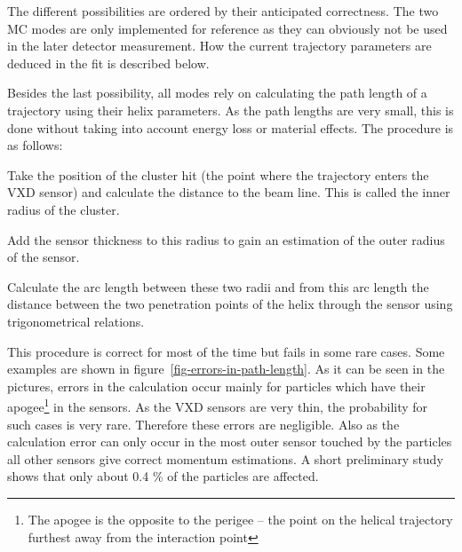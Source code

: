The different possibilities are ordered by their anticipated correctness. The two MC modes are only implemented for reference as they can obviously not be used in the later detector measurement. How the current trajectory parameters are deduced in the fit is described below.

Besides the last possibility, all modes rely on calculating the path length of a trajectory using their helix parameters. As the path lengths are very small, this is done without taking into account energy loss or material effects. The procedure is as follows:
\begin{zlist}
 \item Take the position of the cluster hit (the point where the trajectory enters the VXD sensor) and calculate the distance to the beam line. This is called the inner radius of the cluster.
 \item Add the sensor thickness to this radius to gain an estimation of the outer radius of the sensor.
 \item Calculate the arc length between these two radii and from this arc length the distance between the two penetration points of the helix through the sensor using trigonometrical relations.
\end{zlist}

This procedure is correct for most of the time but fails in some rare cases. Some examples are shown in figure~\ref{fig-errors-in-path-length}. As it can be seen in the pictures, errors in the calculation occur mainly for particles which have their apogee\footnote{The apogee is the opposite to the perigee -- the point on the helical trajectory furthest away from the interaction point} in the sensors. As the VXD sensors are very thin, the probability for such cases is very rare. Therefore these errors are negligible. Also as the calculation error can only occur in the most outer sensor touched by the particles all other sensors give correct momentum estimations. A short preliminary study shows that only about 0.4 \% of the particles are affected.

